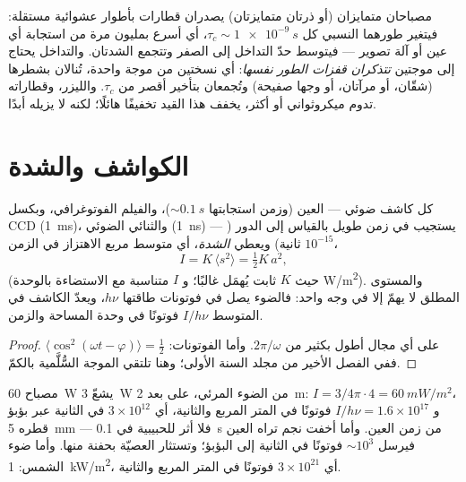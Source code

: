\begin{remark}\label{rem:b2:scalar-light-model:twosources}
مصباحان متمايزان (أو ذرتان متمايزتان) يصدران قطارات بأطوار
عشوائية مستقلة: فيتغير طورهما النسبي كل $\tau_c
\sim \qty{1e-9}{s}$، أي أسرع بمليون مرة من استجابة أي عين أو آلة
تصوير --- فيتوسط حدّ التداخل إلى الصفر وتتجمع
الشدتان. والتداخل يحتاج إلى موجتين \emph{تتذكران قفزات
الطور نفسها}: أي نسختين من موجة واحدة، تُنالان بشطرها
(شقّان، أو مرآتان، أو وجها صفيحة) وتُجمعان بتأخير
أقصر من $\tau_c$. والليزر، وقطاراته تدوم ميكروثواني أو
أكثر، يخفف هذا القيد تخفيفًا هائلًا؛ لكنه لا يزيله أبدًا.
\end{remark}

\section{الكواشف والشدة}

\begin{proposition}\label{prop:b2:scalar-light-model:intensity}
كل كاشف ضوئي --- العين (وزمن استجابتها $\sim\qty{0.1}{s}$)، والفيلم
الفوتوغرافي، وبكسل CCD (\qty{1}{ms})، والثنائي الضوئي (\qty{1}{ns}) ---
يستجيب في زمن طويل بالقياس إلى الدور ($10^{-15}$ ثانية)
ويعطي \emph{الشدة}، أي متوسط مربع الاهتزاز
في الزمن،
\[
I = K\,\langle s^2\rangle = \tfrac12K\,a^2 ,
\]
(حيث $K$ ثابت يُهمَل غالبًا؛ و $I$ متناسبة مع الاستضاءة
بالوحدة \unit{W/m^2}). والمستوى المطلق لا يهمّ إلا في وجه واحد: فالضوء
يصل في فوتونات طاقتها $h\nu$، ويعدّ الكاشف في المتوسط
$I/h\nu$ فوتونًا في وحدة المساحة والزمن.
\end{proposition}

\begin{proof}
$\langle\cos^2(\omega t - \varphi)\rangle = \tfrac12$ على أي مجال أطول بكثير
من $2\pi/\omega$. وأما الفوتونات: ففي الفصل الأخير من مجلد السنة الأولى؛ وهنا
تلتقي الموجة السُّلَّمية بالكمّ.
\end{proof}

\begin{example}\label{ex:b2:scalar-light-model:orders}
مصباح \qty{60}{W} يشعّ \qty{3}{W} من الضوء المرئي، على بعد \qty{2}{m}:
$I = 3/4\pi\cdot4 = \qty{60}{mW/m^2}$، و $I/h\nu = 1.6 \times 10^{17}$ فوتونًا في المتر
المربع والثانية، أي $3 \times 10^{12}$ في الثانية عبر بؤبؤ قطره \qty{5}{mm} ---
فلا أثر للحبيبية في \qty{0.1}{s} من زمن العين. وأما
أخفت نجم تراه العين فيرسل $\sim 10^3$ فوتونًا في الثانية إلى
البؤبؤ؛ وتستثار العصيّة بحفنة منها. وأما ضوء الشمس: \qty{1}{kW/m^2}، أي $3 \times 10^{21}$
فوتونًا في المتر المربع والثانية.
\end{example}

